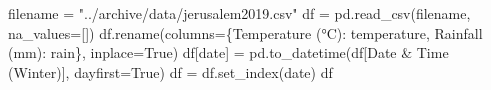 \documentclass[
  letterpaper,
  DIV=11,
  numbers=noendperiod,
  oneside]{scrreprt}
\newenvironment{Shaded}{\begin{snugshade}}{\end{snugshade}}
\newcommand{\NormalTok}[1]{\textcolor[rgb]{0.00,0.23,0.31}{#1}}
\newcommand{\OperatorTok}[1]{\textcolor[rgb]{0.37,0.37,0.37}{#1}}
\newcommand{\StringTok}[1]{\textcolor[rgb]{0.13,0.47,0.30}{#1}}
\newcommand{\VariableTok}[1]{\textcolor[rgb]{0.07,0.07,0.07}{#1}}
\begin{document}
\begin{Shaded}
\begin{Highlighting}[]
\NormalTok{filename }\OperatorTok{=} \StringTok{"../archive/data/jerusalem2019.csv"}
\NormalTok{df }\OperatorTok{=}\NormalTok{ pd.read\_csv(filename, na\_values}\OperatorTok{=}\NormalTok{[}\StringTok{\textquotesingle{}{-}\textquotesingle{}}\NormalTok{])}
\NormalTok{df.rename(columns}\OperatorTok{=}\NormalTok{\{}\StringTok{\textquotesingle{}Temperature (°C)\textquotesingle{}}\NormalTok{: }\StringTok{\textquotesingle{}temperature\textquotesingle{}}\NormalTok{,}
                   \StringTok{\textquotesingle{}Rainfall (mm)\textquotesingle{}}\NormalTok{: }\StringTok{\textquotesingle{}rain\textquotesingle{}}\NormalTok{\}, inplace}\OperatorTok{=}\VariableTok{True}\NormalTok{)}
\NormalTok{df[}\StringTok{\textquotesingle{}date\textquotesingle{}}\NormalTok{] }\OperatorTok{=}\NormalTok{ pd.to\_datetime(df[}\StringTok{\textquotesingle{}Date \& Time (Winter)\textquotesingle{}}\NormalTok{], dayfirst}\OperatorTok{=}\VariableTok{True}\NormalTok{)}
\NormalTok{df }\OperatorTok{=}\NormalTok{ df.set\_index(}\StringTok{\textquotesingle{}date\textquotesingle{}}\NormalTok{)}
\NormalTok{df}
\end{Highlighting}
\end{Shaded}
\end{document}

